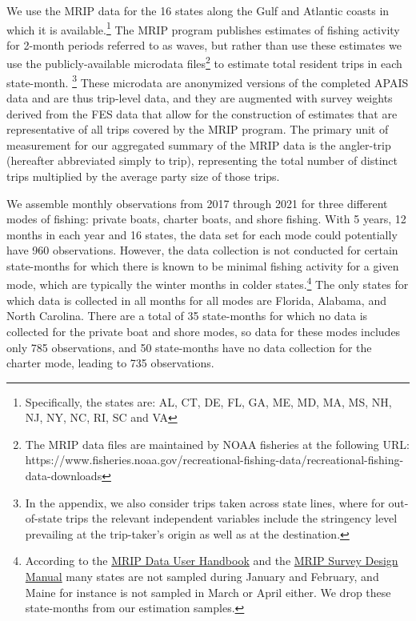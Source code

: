 \documentclass[12pt]{article}
\begin{document}
We use the MRIP data for the 16 states along the Gulf and Atlantic
coasts in which it is available.\footnote{Specifically, the states are:
  AL, CT, DE, FL, GA, ME, MD, MA, MS, NH, NJ, NY, NC, RI, SC and VA} The
MRIP program publishes estimates of fishing activity for 2-month periods
referred to as waves, but rather than use these estimates we use the
publicly-available microdata files\footnote{The MRIP data files are
  maintained by NOAA fisheries at the following URL:
  https://www.fisheries.noaa.gov/recreational-fishing-data/recreational-fishing-data-downloads}
to estimate total resident trips in each state-month. \footnote{In the appendix, we also consider
trips taken across state lines, where for out-of-state trips the
relevant independent variables include the stringency level prevailing
at the trip-taker's origin as well as at the destination.} These microdata are
anonymized versions of the completed APAIS data and are thus trip-level
data, and they are augmented with survey weights derived from the FES
data that allow for the construction of estimates that are
representative of all trips covered by the MRIP program. The primary
unit of measurement for our aggregated summary of the MRIP data is the
angler-trip (hereafter abbreviated simply to trip), representing the
total number of distinct trips multiplied by the average party size of
those trips.
 
We assemble monthly observations from 2017 through 2021 for three
different modes of fishing: private boats, charter boats, and shore
fishing. With 5 years, 12 months in each year and 16 states, the data
set for each mode could potentially have 960 observations. However, the
data collection is not conducted for certain state-months for which
there is known to be minimal fishing activity for a given mode, which
are typically the winter months in colder states.\footnote{According to the
  \href{https://media.fisheries.noaa.gov/2021-09/MRIP\%20Data\%20User\%20Handbook\%20Updated\%202021-09-30.pdf}{MRIP
  Data User Handbook} and the \href{https://media.fisheries.noaa.gov/2021-09/MRIP-Survey-Design-and-Statistical-Methods-2021-09-15.pdf}{MRIP
  Survey Design Manual} many states are not sampled during January and February, and Maine for instance is not
  sampled in March or April either.  We drop these state-months from our
  estimation samples.} The only states for which data is collected in
all months for all modes are Florida, Alabama, and North Carolina. There
are a total of 35 state-months for which no data is collected for the
private boat and shore modes, so data for these modes includes only 785
observations, and 50 state-months have no data collection for the
charter mode, leading to 735 observations.
\end{document}
